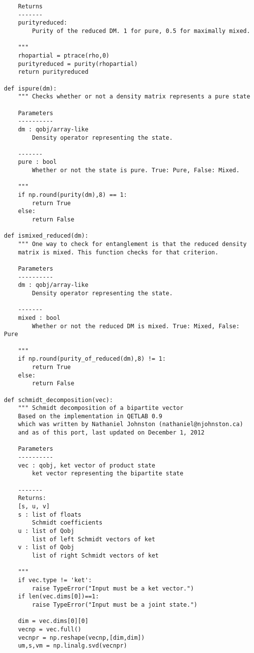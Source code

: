 \begin{verbatim}
    Returns
    -------
    purityreduced:
        Purity of the reduced DM. 1 for pure, 0.5 for maximally mixed.
    
    """
    rhopartial = ptrace(rho,0)
    purityreduced = purity(rhopartial)
    return purityreduced

def ispure(dm):
    """ Checks whether or not a density matrix represents a pure state
    
    Parameters
    ----------
    dm : qobj/array-like
        Density operator representing the state.
    
    -------
    pure : bool
        Whether or not the state is pure. True: Pure, False: Mixed.
        
    """
    if np.round(purity(dm),8) == 1:
        return True
    else:
        return False

def ismixed_reduced(dm):
    """ One way to check for entanglement is that the reduced density
    matrix is mixed. This function checks for that criterion.
    
    Parameters
    ----------
    dm : qobj/array-like
        Density operator representing the state.
    
    -------
    mixed : bool
        Whether or not the reduced DM is mixed. True: Mixed, False: Pure
        
    """
    if np.round(purity_of_reduced(dm),8) != 1:
        return True
    else:
        return False

def schmidt_decomposition(vec):
    """ Schmidt decomposition of a bipartite vector
    Based on the implementation in QETLAB 0.9
    which was written by Nathaniel Johnston (nathaniel@njohnston.ca)
    and as of this port, last updated on December 1, 2012
    
    Parameters
    ----------
    vec : qobj, ket vector of product state
        ket vector representing the bipartite state
    
    -------
    Returns:
    [s, u, v]
    s : list of floats
        Schmidt coefficients
    u : list of Qobj
        list of left Schmidt vectors of ket
    v : list of Qobj
        list of right Schmidt vectors of ket
        
    """
    if vec.type != 'ket':
        raise TypeError("Input must be a ket vector.")
    if len(vec.dims[0])==1:
        raise TypeError("Input must be a joint state.")
    
    dim = vec.dims[0][0]
    vecnp = vec.full()
    vecnpr = np.reshape(vecnp,[dim,dim])
    um,s,vm = np.linalg.svd(vecnpr)
    

\end{verbatim}
